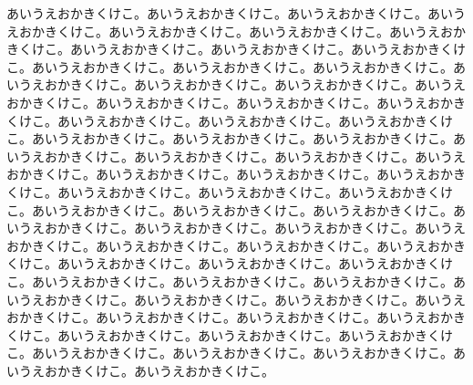\lettrine{あ}
いうえおかきくけこ。あいうえおかきくけこ。あいうえおかきくけこ。あいうえおかきくけこ。あいうえおかきくけこ。あいうえおかきくけこ。あいうえおかきくけこ。あいうえおかきくけこ。あいうえおかきくけこ。あいうえおかきくけこ。あいうえおかきくけこ。あいうえおかきくけこ。あいうえおかきくけこ。あいうえおかきくけこ。あいうえおかきくけこ。あいうえおかきくけこ。あいうえおかきくけこ。あいうえおかきくけこ。あいうえおかきくけこ。あいうえおかきくけこ。あいうえおかきくけこ。あいうえおかきくけこ。あいうえおかきくけこ。あいうえおかきくけこ。あいうえおかきくけこ。あいうえおかきくけこ。あいうえおかきくけこ。あいうえおかきくけこ。あいうえおかきくけこ。あいうえおかきくけこ。あいうえおかきくけこ。あいうえおかきくけこ。あいうえおかきくけこ。あいうえおかきくけこ。あいうえおかきくけこ。あいうえおかきくけこ。あいうえおかきくけこ。あいうえおかきくけこ。あいうえおかきくけこ。あいうえおかきくけこ。あいうえおかきくけこ。あいうえおかきくけこ。あいうえおかきくけこ。あいうえおかきくけこ。あいうえおかきくけこ。あいうえおかきくけこ。あいうえおかきくけこ。あいうえおかきくけこ。あいうえおかきくけこ。あいうえおかきくけこ。あいうえおかきくけこ。あいうえおかきくけこ。あいうえおかきくけこ。あいうえおかきくけこ。あいうえおかきくけこ。あいうえおかきくけこ。あいうえおかきくけこ。あいうえおかきくけこ。あいうえおかきくけこ。あいうえおかきくけこ。あいうえおかきくけこ。あいうえおかきくけこ。あいうえおかきくけこ。あいうえおかきくけこ。あいうえおかきくけこ。あいうえおかきくけこ。あいうえおかきくけこ。